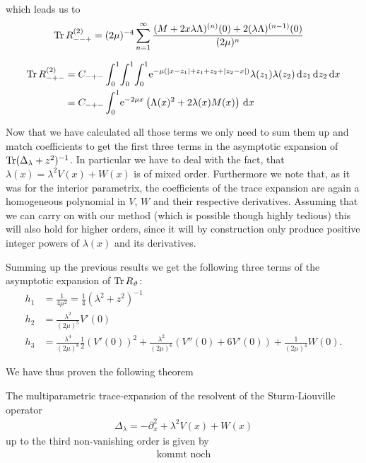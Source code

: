 which leads us to
\begin{align*}
  \Tr R_{--+}^{(2)}
  &= (2\mu)^{-4} \sum_{n=1}^{\infty}
  \frac{
    (M + 2x\lambda\Lambda)^{(n)}(0)
    + 2(\lambda\Lambda)^{(n-1)}(0)
  }{(2\mu)^n}
\end{align*}

\begin{align*}
  \Tr R_{-+-}^{(2)} &= C_{-+-} \Int{x}{
    \Int{z_2}{
      \Int{z_1}{
        \Eto{-\mu(\Abs{x-z_1}+z_1+z_2+\Abs{z_2-x})}\lambda(z_1)\lambda(z_2)
      }
    }
  } \\
  &= C_{-+-} \Int{x}{
    \Eto{-2\mu x}
    \left(
      \Lambda(x)^2 + 2\lambda(x)M(x)
    \right)
  }
\end{align*}

Now that we have calculated all those terms we only need to sum them up and
match coefficients to get the first three terms in the asymptotic expansion of
$\Tr(\Delta_\lambda + z^2)^{-1}$. In particular we have to deal with the fact,
that $\lambda(x) = \lambda^2 V(x) + W(x)$ is of mixed order. Furthermore we note
that, as it was for the interior parametrix, the coefficients of the trace
expansion are again a homogeneous polynomial in $V$, $W$ and their respective
derivatives. Assuming that we can carry on with our method (which is possible
though highly tedious) this will also hold for higher orders, since it will by
construction only produce positive integer powers of $\lambda(x)$ and its
derivatives.

Summing up the previous results we get the following three terms of the
asymptotic expansion of $\Tr R_\theta$:
\begin{align}
  h_1 &= \frac{1}{4\mu^2} = \frac{1}{4} (\lambda^2 + z^2)^{-1} \\
  h_2 &= \frac{\lambda^2}{(2\mu)^5} V'(0) \\
  h_3 &= \frac{\lambda^4}{(2\mu)^8} \frac12 (V'(0))^{2}
       + \frac{\lambda^2}{(2\mu)^6} \left(V''(0) + 6V'(0)\right)
       + \frac1{(2\mu)^4} W(0).
\end{align}

We have thus proven the following theorem
\begin{MainTheorem}
  The multiparametric trace-expansion of the resolvent of the Sturm-Liouville
  operator
  \begin{align*}
    \Delta_\lambda = -\partial_x^2 + \lambda^2 V(x) + W(x)
  \end{align*}
  up to the third non-vanishing order is given by
  \begin{align*}
    \text{kommt noch}
  \end{align*}
\end{MainTheorem}
